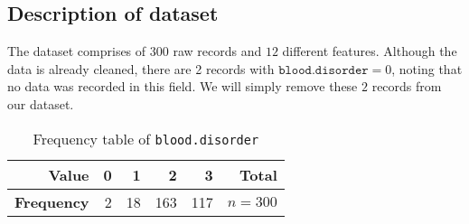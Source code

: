 

\subsection{Description of dataset}
The dataset comprises of \( 300 \) raw records and \( 12 \) different features. Although the data is already cleaned, there are 2 records with \( \texttt{blood.disorder} = 0 \), noting that no data was recorded in this field. We will simply remove these \( 2 \) records from our dataset.

\begin{table}[H]
    \centering
    \begin{tabular}{rrrrrr}
        \hline
        \textbf{Value} & 0 & 1 & 2 & 3 & Total\\
        \hline
        \textbf{Frequency} & 2 & 18 & 163 & 117 & \(n = 300\)\\
        \hline
    \end{tabular}
    \vspace{4pt}
    \caption{Frequency table of \texttt{blood.disorder}}
\end{table}




